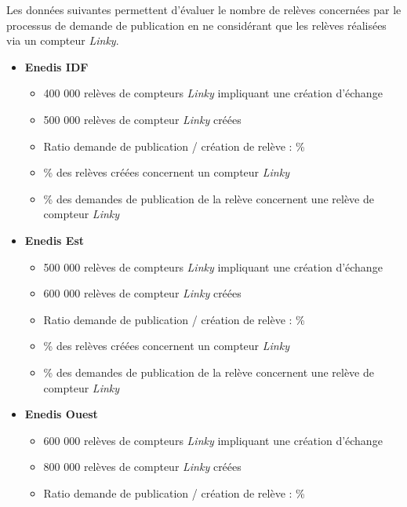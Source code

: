 \documentclass[a4paper, 12pt]{report}
\begin{document}
\vspace{0.6cm}

Les données suivantes permettent d’évaluer le nombre de relèves concernées par le processus de demande de publication en ne considérant que les relèves réalisées via un compteur \textit{\textit{Linky}}.\\

\begin{itemize}
  \item \textbf{Enedis IDF}
  \begin{itemize}
    \item \approx{} 400 000 relèves de compteurs \textit{\textit{Linky}} impliquant une création d'échange
    \item \approx{} 500 000 relèves de compteur \textit{\textit{Linky}} créées
    \item Ratio demande de publication / création de relève : \approx{}\%
    \item \approx{}\% des relèves créées concernent un compteur \textit{\textit{Linky}}
    \item \approx{}\% des demandes de publication de la relève concernent une relève de compteur \textit{\textit{Linky}}
  \end{itemize}
  \item \textbf{Enedis Est}
  \begin{itemize}
    \item \approx{} 500 000 relèves de compteurs \textit{Linky} impliquant une création d'échange
    \item \approx{} 600 000 relèves de compteur \textit{Linky} créées
    \item Ratio demande de publication / création de relève : \approx{}\%
    \item \approx{}\% des relèves créées concernent un compteur \textit{Linky}
    \item \approx{}\% des demandes de publication de la relève concernent une relève de compteur \textit{Linky}
  \end{itemize}
  \item \textbf{Enedis Ouest}
  \begin{itemize}
    \item \approx{} 600 000 relèves de compteurs \textit{Linky} impliquant une création d'échange
    \item \approx{} 800 000 relèves de compteur \textit{Linky} créées
    \item Ratio demande de publication / création de relève : \approx{}\%

\end{itemize}
\end{itemize}
\end{document}
